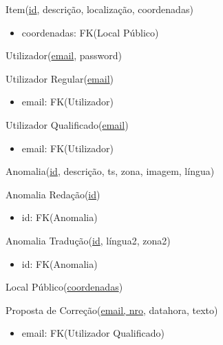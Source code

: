 \documentclass[12pt]{report}
\begin{document}
\begin{multicols}{2}
Item(\underline{id}, descrição, localização, coordenadas)
    \begin{itemize}
    \item coordenadas: FK(Local Público)
    \end{itemize}

\vspace{5mm}


Utilizador(\underline{email}, password)

Utilizador Regular(\underline{email})
    \begin{itemize}
    \item email: FK(Utilizador)
    \end{itemize}


Utilizador Qualificado(\underline{email})
    \begin{itemize}
    \item email: FK(Utilizador)
    \end{itemize}

\vspace{5mm}



Anomalia(\underline{id}, descrição, ts, zona, imagem, língua)


Anomalia Redação(\underline{id})
    \begin{itemize}
    \item id: FK(Anomalia)
    \end{itemize}


Anomalia Tradução(\underline{id}, língua2, zona2)
    \begin{itemize}
    \item id: FK(Anomalia)
    \end{itemize}


\vspace{5mm}


Local Público(\underline{coordenadas})


\vspace{5mm}


Proposta de Correção(\underline{email, nro}, datahora, texto)
    \begin{itemize}
    \item email: FK(Utilizador Qualificado)
    \end{itemize}




\end{multicols}
\end{document}

